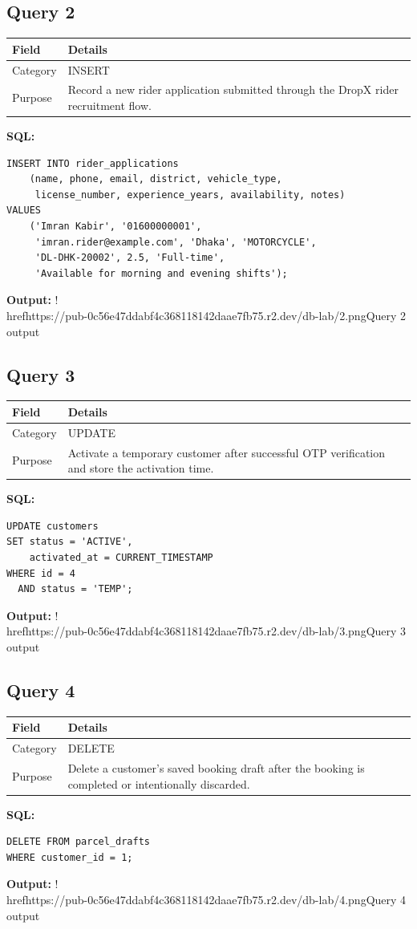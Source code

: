 \documentclass[11pt,a4paper]{article}
\begin{document}
\subsection{Query 2}
\begin{tabularx}{\linewidth}{>{\raggedright\arraybackslash}X|>{\raggedright\arraybackslash}X}
\hline
\textbf{Field} & \textbf{Details} \\ 
\hline
Category & INSERT \\ 
\hline
Purpose & Record a new rider application submitted through the DropX rider recruitment flow. \\ 
\hline
\end{tabularx}
\textbf{SQL:}
\begin{lstlisting}
INSERT INTO rider_applications
    (name, phone, email, district, vehicle_type,
     license_number, experience_years, availability, notes)
VALUES
    ('Imran Kabir', '01600000001',
     'imran.rider@example.com', 'Dhaka', 'MOTORCYCLE',
     'DL-DHK-20002', 2.5, 'Full-time',
     'Available for morning and evening shifts');
\end{lstlisting}
\textbf{Output:}
!\\href{https://pub-0c56e47ddabf4c368118142daae7fb75.r2.dev/db-lab/2.png}{Query 2 output}
\subsection{Query 3}
\begin{tabularx}{\linewidth}{>{\raggedright\arraybackslash}X|>{\raggedright\arraybackslash}X}
\hline
\textbf{Field} & \textbf{Details} \\ 
\hline
Category & UPDATE \\ 
\hline
Purpose & Activate a temporary customer after successful OTP verification and store the activation time. \\ 
\hline
\end{tabularx}
\textbf{SQL:}
\begin{lstlisting}
UPDATE customers
SET status = 'ACTIVE',
    activated_at = CURRENT_TIMESTAMP
WHERE id = 4
  AND status = 'TEMP';
\end{lstlisting}
\textbf{Output:}
!\\href{https://pub-0c56e47ddabf4c368118142daae7fb75.r2.dev/db-lab/3.png}{Query 3 output}
\subsection{Query 4}
\begin{tabularx}{\linewidth}{>{\raggedright\arraybackslash}X|>{\raggedright\arraybackslash}X}
\hline
\textbf{Field} & \textbf{Details} \\ 
\hline
Category & DELETE \\ 
\hline
Purpose & Delete a customer's saved booking draft after the booking is completed or intentionally discarded. \\ 
\hline
\end{tabularx}
\textbf{SQL:}
\begin{lstlisting}
DELETE FROM parcel_drafts
WHERE customer_id = 1;
\end{lstlisting}
\textbf{Output:}
!\\href{https://pub-0c56e47ddabf4c368118142daae7fb75.r2.dev/db-lab/4.png}{Query 4 output}
\end{document}
